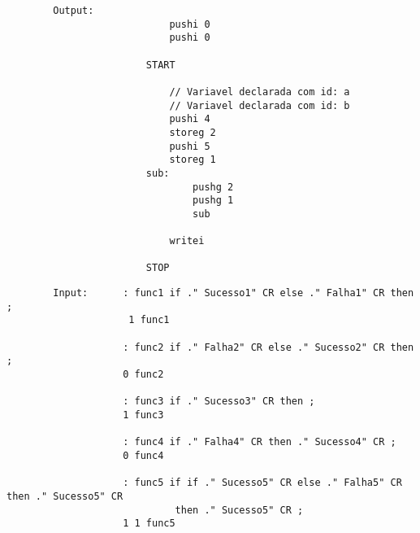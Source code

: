 \documentclass{article}
\begin{document}
        
        \begin{verbatim}
        Output: 	
                    		pushi 0
                        	pushi 0
                        
                        START
                        
                        	// Variavel declarada com id: a
                        	// Variavel declarada com id: b
                        	pushi 4
                        	storeg 2
                        	pushi 5
                        	storeg 1
                        sub:
                        		pushg 2
                        		pushg 1
                        		sub
                        	
                        	writei
                        
                        STOP
        \end{verbatim}
        
    \vspace{1cm}

    \vspace{0.5cm}
        
        \begin{verbatim}
        Input:      : func1 if ." Sucesso1" CR else ." Falha1" CR then ;
                     1 func1

                    : func2 if ." Falha2" CR else ." Sucesso2" CR then ;
                    0 func2
                
                    : func3 if ." Sucesso3" CR then ;
                    1 func3
                
                    : func4 if ." Falha4" CR then ." Sucesso4" CR ; 
                    0 func4
                
                    : func5 if if ." Sucesso5" CR else ." Falha5" CR then ." Sucesso5" CR 
                             then ." Sucesso5" CR ;
                    1 1 func5

        \end{verbatim}
\end{document}
